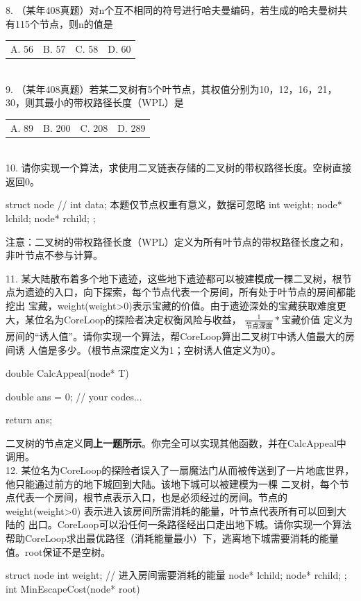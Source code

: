     8. （某年408真题）对n个互不相同的符号进行哈夫曼编码，若生成的哈夫曼树共有115个节点，则n的值是\\[0.5em]
    \begin{tabular}{llll}
    A. 56 & B. 57 & C. 58 & D. 60
    \end{tabular}\\

    9. （某年408真题）若某二叉树有5个叶节点，其权值分别为10，12，16，21，30，则其最小的带权路径长度（WPL）是\underline{\hspace{1cm}}\\[0.5em]
    \begin{tabular}{llll}
        A. 89 & B. 200 & C. 208 & D. 289
    \end{tabular}\\


    10. 请你实现一个算法，求使用二叉链表存储的二叉树的带权路径长度。空树直接返回0。
    \begin{cppcode}
        struct node {
            // int data;  本题仅节点权重有意义，数据可忽略
            int weight;
            node* lchild;
            node* rchild;
        };
    \end{cppcode}
    注意：二叉树的带权路径长度（WPL）定义为所有叶节点的带权路径长度之和，非叶节点不参与计算。

    \vspace{\baselineskip}

    11. 某大陆散布着多个地下遗迹，这些地下遗迹都可以被建模成一棵二叉树，根节点为遗迹的入口，向下探索，每个节点代表一个房间，所有处于叶节点的房间都能挖出
    宝藏，weight(weight>0)表示宝藏的价值。由于遗迹深处的宝藏获取难度更大，某位名为CoreLoop的探险者决定权衡风险与收益，
     $\frac{1}{\text{节点深度}}*\text{宝藏价值}$ 定义为房间的“诱人值”。请你实现一个算法，帮CoreLoop算出二叉树T中诱人值最大的房间诱
     人值是多少。（根节点深度定义为1；空树诱人值定义为0）。
    \begin{cppcode}
        double CalcAppeal(node* T) {
            double ans = 0;
            // your codes...

            return ans;
        }
    \end{cppcode}
    二叉树的节点定义{\color{red}\textbf{同上一题所示}}。你完全可以实现其他函数，并在CalcAppeal中调用。\\

    12. 某位名为CoreLoop的探险者误入了一扇魔法门从而被传送到了一片地底世界，他只能通过前方的地下城回到大陆。该地下城可以被建模为一棵
    二叉树，每个节点代表一个房间，根节点表示入口，也是必须经过的房间。节点的 weight(weight>0) 表示进入该房间所需消耗的能量，叶节点代表所有可以回到大陆的
    出口。CoreLoop可以沿任何一条路径经出口走出地下城。请你实现一个算法帮助CoreLoop求出最优路径（消耗能量最小）下，逃离地下城需要消耗的能量值。root保证不是空树。
    \begin{cppcode}
        struct node {
            int weight;     // 进入房间需要消耗的能量
            node* lchild;
            node* rchild;
        };
        int MinEscapeCost(node* root) {

        }
    \end{cppcode}


